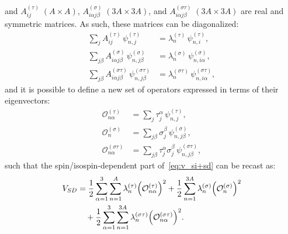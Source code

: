 \documentclass[aps,prc,twocolumn,superscriptaddress,floatfix]{revtex4-1}
\begin{document}
and $A^{(\tau)}_{ij}\;(A\times A)$, $A^{(\sigma)}_{i\alpha j\beta}\;(3A\times 3A)$, 
and $A^{(\sigma\tau)}_{i\alpha j\beta}\;(3A\times 3A)$
are real and symmetric matrices.
As such, these matrices can be diagonalized:
\begin{align}
\sum_{j}A^{(\tau)}_{ij}\,\psi_{n,j}^{(\tau)}&=\lambda_n^{(\tau)}\,\psi_{n,i}^{(\tau)} , \nonumber \\
\sum_{j\beta}A^{(\sigma)}_{i\alpha j\beta}\,\psi_{n,j\beta}^{(\sigma)}&=\lambda_n^{(\sigma)}\,\psi_{n,i\alpha}^{(\sigma)} , \nonumber \\
\sum_{j\beta}A^{(\sigma\tau)}_{i\alpha j\beta}\,\psi_{n,j\beta}^{(\sigma\tau)}&=\lambda_n^{(\sigma\tau)}\,\psi_{n,i\alpha}^{(\sigma\tau)} ,
\end{align}
and it is possible to define a new set of operators expressed in terms of their eigenvectors: 
\begin{align}
\mathcal O_{n\alpha}^{(\tau)}&=\sum_{j}\tau_j^\alpha\,\psi_{n,j}^{(\tau)} , \nonumber \\
\mathcal O_{n}^{(\sigma)}&=\sum_{j\beta}\sigma_j^\beta\,\psi_{n,j\beta}^{(\sigma)} , \nonumber \\
\mathcal O_{n\alpha}^{(\sigma\tau)}&=\sum_{j\beta}\tau_j^\alpha\sigma_j^\beta\,\psi_{n,j\beta}^{(\sigma\tau)} ,  
\end{align}
such that the spin/isospin-dependent part of~\cref{eq:v_si+sd} can be recast as:
\begin{align}
V_{SD}&= 
 {1\over2}\sum_{\alpha=1}^3\sum_{n=1}^{A} \lambda_n^{(\tau)}\Big(\mathcal O_{n\alpha}^{(\tau)}\Big)^2
+{1\over2}\sum_{n=1}^{3A} \lambda_n^{(\sigma)}\Big(\mathcal O_n^{(\sigma)}\Big)^2 \nonumber \\
&\quad+{1\over2}\sum_{\alpha=1}^3\sum_{n=1}^{3A} \lambda_n^{(\sigma\tau)}\Big(\mathcal O_{n\alpha}^{(\sigma\tau)}\Big)^2 .
\end{align}
\end{document}
